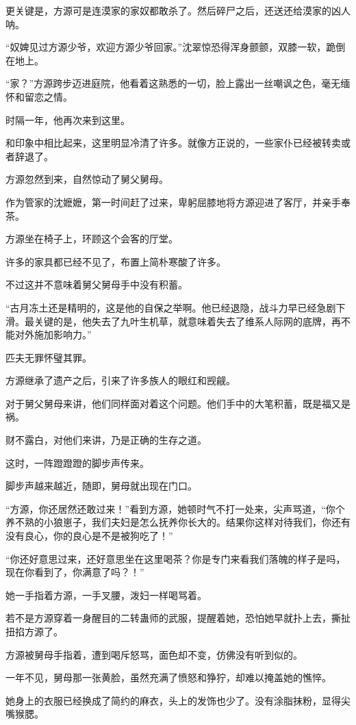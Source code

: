\begin{this_body}
更关键是，方源可是连漠家的家奴都敢杀了。然后碎尸之后，还送还给漠家的凶人呐。

“奴婢见过方源少爷，欢迎方源少爷回家。”沈翠惊恐得浑身颤颤，双膝一软，跪倒在地上。

“家？”方源跨步迈进庭院，他看着这熟悉的一切，脸上露出一丝嘲讽之色，毫无缅怀和留恋之情。

时隔一年，他再次来到这里。

和印象中相比起来，这里明显冷清了许多。就像方正说的，一些家仆已经被转卖或者辞退了。

方源忽然到来，自然惊动了舅父舅母。

作为管家的沈嬷嬷，第一时间赶了过来，卑躬屈膝地将方源迎进了客厅，并亲手奉茶。

方源坐在椅子上，环顾这个会客的厅堂。

许多的家具都已经不见了，布置上简朴寒酸了许多。

不过这并不意味着舅父舅母手中没有积蓄。

“古月冻土还是精明的，这是他的自保之举啊。他已经退隐，战斗力早已经急剧下滑。最关键的是，他失去了九叶生机草，就意味着失去了维系人际网的底牌，再不能对外施加影响力。”

匹夫无罪怀璧其罪。

方源继承了遗产之后，引来了许多族人的眼红和觊觎。

对于舅父舅母来讲，他们同样面对着这个问题。他们手中的大笔积蓄，既是福又是祸。

财不露白，对他们来讲，乃是正确的生存之道。

这时，一阵蹬蹬蹬的脚步声传来。

脚步声越来越近，随即，舅母就出现在门口。

“方源，你还居然还敢过来！”看到方源，她顿时气不打一处来，尖声骂道，“你个养不熟的小狼崽子，我们夫妇是怎么抚养你长大的。结果你这样对待我们，你还有没有良心，你的良心是不是被狗吃了！”

“你还好意思过来，还好意思坐在这里喝茶？你是专门来看我们落魄的样子是吗，现在你看到了，你满意了吗？！”

她一手指着方源，一手叉腰，泼妇一样喝骂着。

若不是方源穿着一身醒目的二转蛊师的武服，提醒着她，恐怕她早就扑上去，撕扯扭掐方源了。

方源被舅母手指着，遭到喝斥怒骂，面色却不变，仿佛没有听到似的。

一年不见，舅母那一张黄脸，虽然充满了愤怒和狰狞，却难以掩盖她的憔悴。

她身上的衣服已经换成了简约的麻衣，头上的发饰也少了。没有涂脂抹粉，显得尖嘴猴腮。


\end{this_body}
